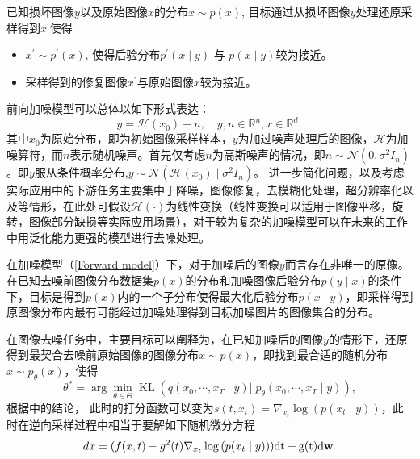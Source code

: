 已知损坏图像$y$以及原始图像$x$的分布$x\sim p(x)$, 目标通过从损坏图像$y$处理还原采样得到$x^{\prime}$使得
\begin{itemize}
    \item $x^{\prime}\sim p^{\prime}(x)$, 使得后验分布$p^{\prime}(x\mid y)$ 与 $p(x\mid y)$较为接近。 
    \item  采样得到的修复图像$x^{\prime}$与原始图像$x$较为接近。 
\end{itemize}
前向加噪模型可以总体以如下形式表达：
\begin{equation}
y=\mathcal{H}\left(x_0\right)+{n}, \quad y, {n} \in \mathbb{R}^n, x \in \mathbb{R}^d,
\label{Forward model}
\end{equation}
其中$x_0$为原始分布，即为初始图像采样样本，$y$为加过噪声处理后的图像，$\mathcal{H}$为加噪算符，而$n$表示随机噪声。首先仅考虑$n$为高斯噪声的情况，即$n\sim \mathcal{N}(0,\sigma^2 I_n)$。即$y$服从条件概率分布,$y\sim \mathcal{N}(\mathcal{H}(x_0)\mid \sigma^2 I_n)$。
进一步简化问题，以及考虑实际应用中的下游任务主要集中于降噪，图像修复，去模糊化处理，超分辨率化以及等情形，在此处可假设$\mathcal{H}(\cdot)$为线性变换（线性变换可以适用于图像平移，旋转，图像部分缺损等实际应用场景），对于较为复杂的加噪模型可以在未来的工作中用泛化能力更强的模型进行去噪处理。      
\begin{definition}[图像去噪]
在加噪模型（\ref{Forward model}）下，对于加噪后的图像$y$而言存在非唯一的原像。在已知去噪前图像分布数据集$p(x)$的分布和加噪图像后验分布$p(y\mid x)$的条件下，目标是得到$p(x)$内的一个子分布使得最大化后验分布$p(x\mid y)$，即采样得到原图像分布内最有可能经过加噪处理得到目标加噪图片的图像集合的分布。
\end{definition}

在图像去噪任务中，主要目标可以阐释为，在已知加噪后的图像$y$的情形下，还原得到最契合去噪前原始图像的图像分布$x\sim p(x)$，即找到最合适的随机分布$x\sim p_{\theta}(x)$，使得
\begin{equation}
 \theta^{* }= \arg\min_{\theta\in \Theta}\operatorname{KL}(q(x_0,\cdots, x_T\mid y)||p_{\theta}(x_0,\cdots,x_T\mid y)), 
\end{equation}
根据\cite{score_based_SDE}中的结论， 此时的打分函数可以变为$s(t,x_t) = \nabla_{x_t}\log\left(p(x_t\mid y)\right)$，此时在逆向采样过程中相当于要解如下随机微分方程
\begin{equation}
    dx = (f(x,t)- g^2(t)\nabla_{x_t}\log\left(p(x_t\mid y)\right))\rm{dt } + g(t) d\mathbf{w}.
    \label{reverse SDE conditional}
\end{equation}






